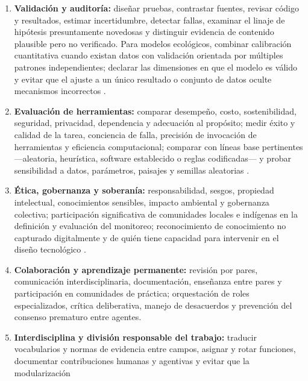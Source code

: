 \documentclass[11pt,a4paper]{article}
\begin{document}
\begin{enumerate}
  información; verificar actualidad, conflicto y procedencia de las fuentes; y
  gestionar qué conservar, resumir o descartar. La recuperación aumentada
  fundamenta las respuestas en conocimiento externo, pero no sustituye la
  evaluación de la evidencia \citep{lewis2020rag,wei2025agentic}.
  \item \textbf{Validación y auditoría:} diseñar pruebas, contrastar fuentes,
  revisar código y resultados, estimar incertidumbre, detectar fallas, examinar el
  linaje de hipótesis presuntamente novedosas y distinguir evidencia de contenido
  plausible pero no verificado. Para modelos ecológicos, combinar calibración
  cuantitativa cuando existan datos con validación orientada por múltiples
  patrones independientes; declarar las dimensiones en que el modelo es válido y
  evitar que el ajuste a un único resultado o conjunto de datos oculte mecanismos
  incorrectos \citep{strannegard2026ecosystem}.
  \item \textbf{Evaluación de herramientas:} comparar desempeño, costo,
  sostenibilidad, seguridad, privacidad, dependencia y adecuación al propósito;
  medir éxito y calidad de la tarea, conciencia de falla, precisión de invocación
  de herramientas y eficiencia computacional; comparar con líneas base
  pertinentes ---aleatoria, heurística, software establecido o reglas
  codificadas--- y probar sensibilidad a datos, parámetros, paisajes y semillas
  aleatorias
  \citep{schneider2025generative,silvestro2022improving,strannegard2026ecosystem}.
  \item \textbf{Ética, gobernanza y soberanía:} responsabilidad, sesgos,
  propiedad intelectual, conocimientos sensibles, impacto ambiental y gobernanza
  colectiva; participación significativa de comunidades locales e indígenas en la
  definición y evaluación del monitoreo; reconocimiento de conocimiento no
  capturado digitalmente y de quién tiene capacidad para intervenir en el diseño
  tecnológico \citep{westerlaken2024digital}.
  \item \textbf{Colaboración y aprendizaje permanente:} revisión por pares,
  comunicación interdisciplinaria, documentación, enseñanza entre pares y
  participación en comunidades de práctica; orquestación de roles especializados,
  crítica deliberativa, manejo de desacuerdos y prevención del consenso prematuro
  entre agentes.
  \item \textbf{Interdisciplina y división responsable del trabajo:} traducir
  vocabularios y normas de evidencia entre campos, asignar y rotar funciones,
  documentar contribuciones humanas y agentivas y evitar que la modularización

\end{enumerate}
\end{document}
